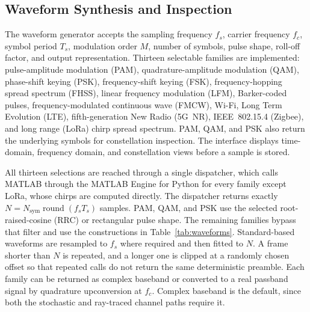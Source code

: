 \documentclass[10pt,conference,letterpaper]{IEEEtran}
\begin{document}
\subsection{Waveform Synthesis and Inspection}

The waveform generator accepts the sampling frequency $f_s$, carrier frequency $f_c$, symbol period $T_s$, modulation order $M$, number of symbols, pulse shape, roll-off factor, and output representation. Thirteen selectable families are implemented: pulse-amplitude modulation (PAM), quadrature-amplitude modulation (QAM), phase-shift keying (PSK), frequency-shift keying (FSK), frequency-hopping spread spectrum (FHSS), linear frequency modulation (LFM), Barker-coded pulses, frequency-modulated continuous wave (FMCW), Wi-Fi, Long Term Evolution (LTE), fifth-generation New Radio (5G~NR), IEEE~802.15.4 (Zigbee), and long range (LoRa) chirp spread spectrum. PAM, QAM, and PSK also return the underlying symbols for constellation inspection. The interface displays time-domain, frequency domain, and constellation views before a sample is stored.

All thirteen selections are reached through a single dispatcher, which calls MATLAB through the MATLAB Engine for Python for every family except LoRa, whose chirps are computed directly. The dispatcher returns exactly $N=N_{\mathrm{sym}}\operatorname{round}(f_sT_s)$ samples. PAM, QAM, and PSK use the selected root-raised-cosine (RRC) or rectangular pulse shape. The remaining families bypass that filter and use the constructions in Table~\ref{tab:waveforms}. Standard-based waveforms are resampled to $f_s$ where required and then fitted to $N$. A frame shorter than $N$ is repeated, and a longer one is clipped at a randomly chosen offset so that repeated calls do not return the same deterministic preamble. Each family can be returned as complex baseband or converted to a real passband signal by quadrature upconversion at $f_c$. Complex baseband is the default, since both the stochastic and ray-traced channel paths require it.
\end{document}
